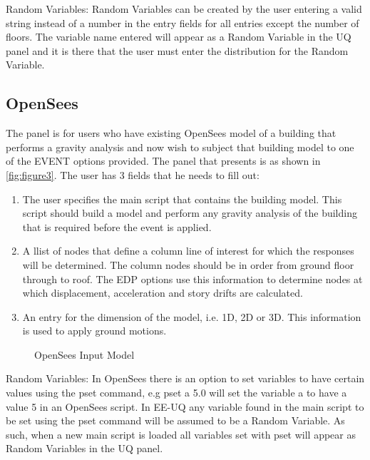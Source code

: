 Random Variables: Random Variables can be created by the user entering
a valid string instead of a number in the entry fields for all entries
except the number of floors. The variable name entered will appear as
a Random Variable in the UQ panel and it is there that the user must
enter the distribution for the Random Variable.


\subsection{OpenSees}
The panel is for users who have existing OpenSees model of a building
that performs a gravity analysis and now wish to subject that building
model to one of the EVENT options provided. The panel that presents is
as shown in \autoref{fig:figure3}. The user has 3 fields that he needs
to fill out:
\begin{enumerate} 
\item The user specifies the main script that contains the building
  model. This script should build a model and perform any gravity
  analysis of the building that is required before the event is
  applied.
\item A llist of nodes that define a column line of interest for which
  the responses will be determined. The column nodes should be in
  order from ground floor through to roof. The EDP options use this
  information to determine nodes at which displacement, acceleration
  and story drifts are calculated.
\item An entry for the dimension of the model, i.e. 1D, 2D or 3D. This
  information is used to apply ground motions.
\end{enumerate}

\begin{figure}[!htbp]
  \caption{OpenSees Input Model}
  \label{fig:figure3}
\end{figure}

Random Variables: In OpenSees there is an option to set variables to
have certain values using the pset command, e.g pset a 5.0 will set
the variable a to have a value 5 in an OpenSees script. In EE-UQ any
variable found in the main script to be set using the pset command
will be assumed to be a Random Variable. As such, when a new main
script is loaded all variables set with pset will appear as Random
Variables in the UQ panel.
